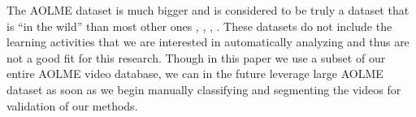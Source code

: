 The AOLME dataset is much bigger and is
considered to be truly a dataset that is ``in the wild'' than most other ones \cite{soomro2012ucf101},
\cite{niebles2010modeling}, \cite{vo2014stochastic}, \cite{spriggs2009temporal}
\cite{rohrbach2012database}. These
 datasets do not include the learning activities
that we are interested in automatically analyzing and thus are not a good fit
for this research. Though in this paper we use a subset of our entire AOLME
video database, we can in the future leverage large AOLME dataset
as soon as we begin manually classifying and segmenting the videos for
validation of our methods.


